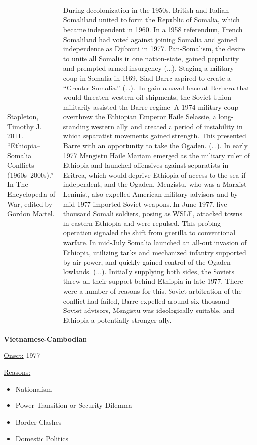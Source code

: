 {\begin{longtable}{p{}p{}}
\\
Stapleton, Timothy J. 2011. “Ethiopia–Somalia Conflicts (1960s–2000s).” In The Encyclopedia of War, edited by Gordon Martel. & During decolonization in the 1950s, British and Italian Somaliland united to form the Republic of Somalia, which became independent in 1960. In a 1958 referendum, French Somaliland had voted against joining Somalia and gained independence as Djibouti in 1977. Pan-Somalism, the desire to unite all Somalis in one nation-state, gained popularity and prompted armed insurgency (...). Staging a military coup in Somalia in 1969, Siad Barre aspired to create a “Greater Somalia.” (...). To gain a naval base at Berbera that would threaten western oil shipments, the Soviet Union militarily assisted the Barre regime. A 1974 military coup overthrew the Ethiopian Emperor Haile Selassie, a long-standing western ally, and created a period of instability in which separatist movements gained strength. This presented Barre with an opportunity to take the Ogaden. (...). 
In early 1977 Mengistu Haile Mariam emerged as the military ruler of Ethiopia and launched offensives against separatists in Eritrea, which would deprive Ethiopia of access to the sea if independent, and the Ogaden. Mengistu, who was a Marxist-Leninist, also expelled American military advisors and by mid-1977 imported Soviet weapons. In June 1977, five thousand Somali soldiers, posing as WSLF, attacked towns in eastern Ethiopia and were repulsed. This probing operation signaled the shift from guerilla to conventional warfare. In mid-July Somalia launched an all-out invasion of Ethiopia, utilizing tanks and mechanized infantry supported by air power, and quickly gained control of the Ogaden lowlands. (...). Initially supplying both sides, the Soviets threw all their support behind Ethiopia in late 1977. There were a number of reasons for this. Soviet arbitration of the conflict had failed, Barre expelled around six thousand Soviet advisors, Mengistu was ideologically suitable, and Ethiopia a potentially stronger ally.

\\
\end{longtable}}
\clearpage
         \textbf{Vietnamese-Cambodian} 

          \underline{Onset:} 1977         

\underline{Reasons:}
\begin{itemize}
\item Nationalism
\item Power Transition or Security Dilemma
\item Border Clashes
\item Domestic Politics
\end{itemize}

